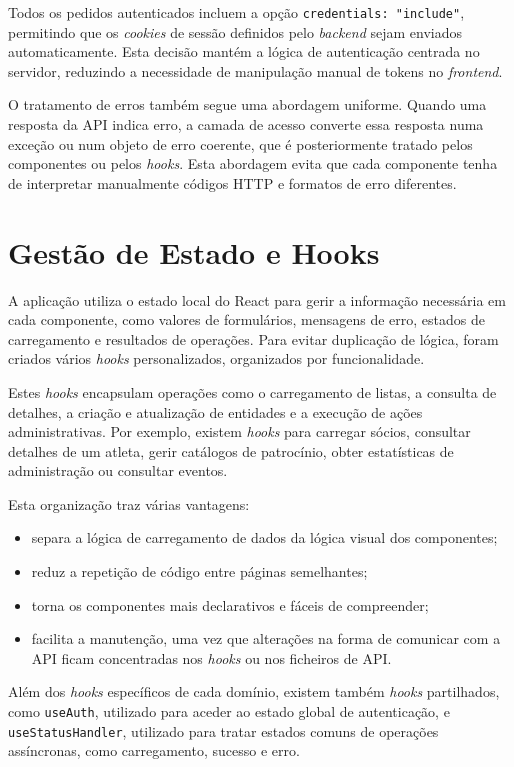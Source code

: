 Todos os pedidos autenticados incluem a opção \texttt{credentials: "include"},
permitindo que os \textit{cookies} de sessão definidos pelo \textit{backend}
sejam enviados automaticamente. Esta decisão mantém a lógica de autenticação
centrada no servidor, reduzindo a necessidade de manipulação manual de tokens no
\textit{frontend}.

O tratamento de erros também segue uma abordagem uniforme. Quando uma resposta
da API indica erro, a camada de acesso converte essa resposta numa exceção ou
num objeto de erro coerente, que é posteriormente tratado pelos componentes ou
pelos \textit{hooks}. Esta abordagem evita que cada componente tenha de
interpretar manualmente códigos HTTP e formatos de erro diferentes.

\section{Gestão de Estado e Hooks}

A aplicação utiliza o estado local do React para gerir a informação necessária
em cada componente, como valores de formulários, mensagens de erro, estados de
carregamento e resultados de operações. Para evitar duplicação de lógica, foram
criados vários \textit{hooks} personalizados, organizados por funcionalidade.

Estes \textit{hooks} encapsulam operações como o carregamento de listas, a
consulta de detalhes, a criação e atualização de entidades e a execução de ações
administrativas. Por exemplo, existem \textit{hooks} para carregar sócios,
consultar detalhes de um atleta, gerir catálogos de patrocínio, obter
estatísticas de administração ou consultar eventos.

Esta organização traz várias vantagens:

\begin{itemize}
    \item separa a lógica de carregamento de dados da lógica visual dos
    componentes;
    \item reduz a repetição de código entre páginas semelhantes;
    \item torna os componentes mais declarativos e fáceis de compreender;
    \item facilita a manutenção, uma vez que alterações na forma de comunicar
    com a API ficam concentradas nos \textit{hooks} ou nos ficheiros de API.
\end{itemize}

Além dos \textit{hooks} específicos de cada domínio, existem também
\textit{hooks} partilhados, como \texttt{useAuth}, utilizado para aceder ao
estado global de autenticação, e \texttt{useStatusHandler}, utilizado para
tratar estados comuns de operações assíncronas, como carregamento, sucesso e
erro.

